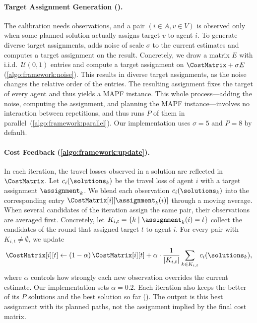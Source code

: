 \paragraph{Target Assignment Generation ().}
The calibration needs observations, and a pair $(i \in A, v \in V)$ is observed only when some planned solution actually assigns target $v$ to agent $i$.
To generate diverse target assignments, \planner adds noise of scale $\sigma$ to the current estimates and computes a target assignment on the result.
Concretely, we draw a matrix $E$ with i.i.d.\ $\mathcal{U}(0,1)$ entries and compute a target assignment on $\CostMatrix + \sigma E$ (\cref{algo:framework:noise}).
This results in diverse target assignments, as the noise changes the relative order of the entries.
The resulting assignment fixes the target of every agent and thus yields a MAPF instance.
This whole process---adding the noise, computing the assignment, and planning the MAPF instance---involves no interaction between repetitions, and thus \planner runs $P$ of them in parallel~(\cref{algo:framework:parallel}).
Our implementation uses $\sigma=5$ and $P=8$ by default. 

\paragraph{Cost Feedback (\cref{algo:framework:update}).}
In each iteration, the travel losses observed in a solution are reflected in $\CostMatrix$.
Let $c_i(\solutions_k)$ be the travel loss of agent $i$ with a target assignment $\assignment_k$.
We blend each observation $c_i(\solutions_k)$ into the corresponding entry $\CostMatrix[i][\assignment_k(i)]$ through a moving average.
When several candidates of the iteration assign the same pair, their observations are averaged first.
Concretely, let $K_{i, t} = \{k \mid \assignment_k(i) = t\}$ collect the candidates of the round that assigned target $t$ to agent $i$.
For every pair with $K_{i, t} \neq \emptyset$, we update
\begin{equation}
\CostMatrix[i][t] \leftarrow (1-\alpha)\, \CostMatrix[i][t]
+ \alpha \cdot \frac{1}{|K_{i,t}|} \sum_{k \in K_{i,t}} c_i(\solutions_k),
\label{eq:update}
\end{equation}
where $\alpha$ controls how strongly each new observation overrides the current estimate.
Our implementation sets $\alpha = 0.2$.
Each iteration also keeps the better of its $P$ solutions and the best solution so far ().
The output is this best assignment with its planned paths, not the assignment implied by the final cost matrix.

